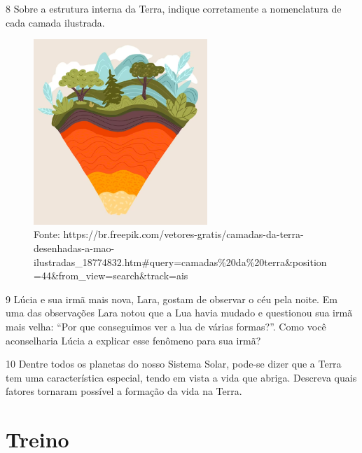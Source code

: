 
\num{8} Sobre a estrutura interna da Terra, indique corretamente a nomenclatura de cada camada ilustrada.

\begin{figure}[htpb!]
\includegraphics[width=2.58803in,height=2.75652in]{./imgs/img11.png}
\caption{Fonte: https://br.freepik.com/vetores-gratis/camadas-da-terra-desenhadas-a-mao-ilustradas\_18774832.htm\#query=camadas\%20da\%20terra\&position=44\&from\_view=search\&track=ais}
\end{figure}



\num{9}  Lúcia e sua irmã mais nova, Lara, gostam de observar o céu pela noite.
  Em uma das observações Lara notou que a Lua havia mudado e questionou
  sua irmã mais velha: ``Por que conseguimos ver a lua de várias
  formas?''. Como você aconselharia Lúcia a explicar esse fenômeno para sua irmã?



\num{10}  Dentre todos os planetas do nosso Sistema Solar, pode-se dizer que a
  Terra tem uma característica especial, tendo em vista a vida que
  abriga. Descreva quais fatores tornaram possível a formação da vida na Terra.



\section{Treino}


